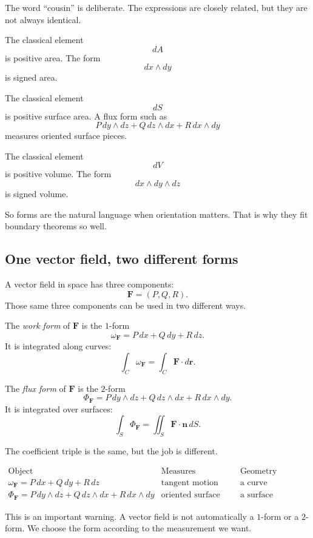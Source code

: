 The word ``cousin'' is deliberate.  The expressions are closely related, but they are not
always identical.

The classical element
\[
    dA
\]
is positive area.  The form
\[
    dx\wedge dy
\]
is signed area.

The classical element
\[
    dS
\]
is positive surface area.  A flux form such as
\[
    P\,dy\wedge dz+Q\,dz\wedge dx+R\,dx\wedge dy
\]
measures oriented surface pieces.

The classical element
\[
    dV
\]
is positive volume.  The form
\[
    dx\wedge dy\wedge dz
\]
is signed volume.

So forms are the natural language when orientation matters.  That is why they fit
boundary theorems so well.

\subsection{One vector field, two different forms}

A vector field in space has three components:
\[
    \mathbf F=(P,Q,R).
\]
Those same three components can be used in two different ways.

The \emph{work form} of \(\mathbf F\) is the \(1\)-form
\[
\boxed{
    \omega_{\mathbf F}=P\,dx+Q\,dy+R\,dz.
}
\]
It is integrated along curves:
\[
    \int_C \omega_{\mathbf F}
    =
    \int_C \mathbf F\cdot d\mathbf r.
\]

The \emph{flux form} of \(\mathbf F\) is the \(2\)-form
\[
\boxed{
    \Phi_{\mathbf F}
    =
    P\,dy\wedge dz
    +
    Q\,dz\wedge dx
    +
    R\,dx\wedge dy.
}
\]
It is integrated over surfaces:
\[
    \int_S \Phi_{\mathbf F}
    =
    \iint_S \mathbf F\cdot \mathbf n\,dS.
\]

The coefficient triple is the same, but the job is different.

\[
\begin{array}{c|c|c}
\text{Object} & \text{Measures} & \text{Geometry supplied by} \\ \hline
\omega_{\mathbf F}=P\,dx+Q\,dy+R\,dz
& \text{tangent motion} & \text{a curve}\\[1mm]
\Phi_{\mathbf F}=P\,dy\wedge dz+Q\,dz\wedge dx+R\,dx\wedge dy
& \text{oriented surface crossing} & \text{a surface}
\end{array}
\]

This is an important warning.  A vector field is not automatically a \(1\)-form or a
\(2\)-form.  We choose the form according to the measurement we want.

